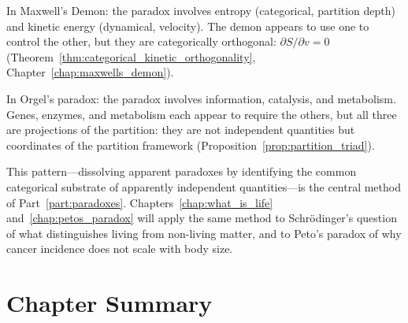 In Maxwell's Demon: the paradox involves entropy (categorical, partition depth)
and kinetic energy (dynamical, velocity). The demon appears to use one to control
the other, but they are categorically orthogonal: $\partial S / \partial v = 0$
(Theorem~\ref{thm:categorical_kinetic_orthogonality}, Chapter~\ref{chap:maxwells_demon}).

In Orgel's paradox: the paradox involves information, catalysis, and metabolism.
Genes, enzymes, and metabolism each appear to require the others, but all three
are projections of the partition: they are not independent quantities but
coordinates of the partition framework (Proposition~\ref{prop:partition_triad}).

This pattern---dissolving apparent paradoxes by identifying the common categorical
substrate of apparently independent quantities---is the central method of
Part~\ref{part:paradoxes}. Chapters~\ref{chap:what_is_life} and~\ref{chap:petos_paradox}
will apply the same method to Schr\"{o}dinger's question of what distinguishes
living from non-living matter, and to Peto's paradox of why cancer incidence
does not scale with body size.

\section*{Chapter Summary}
\label{sec:ch6_summary}

